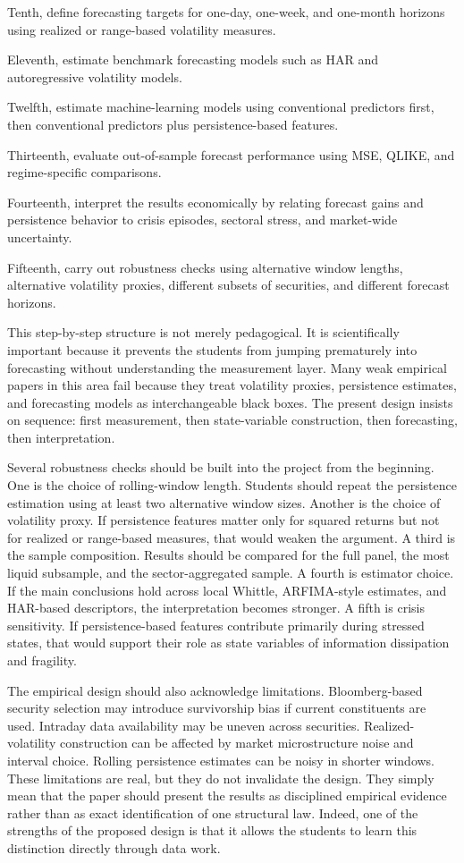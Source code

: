 \documentclass[12pt]{article}
\begin{document}
Tenth, define forecasting targets for one-day, one-week, and one-month horizons using realized or range-based volatility measures.

Eleventh, estimate benchmark forecasting models such as HAR and autoregressive volatility models.

Twelfth, estimate machine-learning models using conventional predictors first, then conventional predictors plus persistence-based features.

Thirteenth, evaluate out-of-sample forecast performance using MSE, QLIKE, and regime-specific comparisons.

Fourteenth, interpret the results economically by relating forecast gains and persistence behavior to crisis episodes, sectoral stress, and market-wide uncertainty.

Fifteenth, carry out robustness checks using alternative window lengths, alternative volatility proxies, different subsets of securities, and different forecast horizons.

This step-by-step structure is not merely pedagogical. It is scientifically important because it prevents the students from jumping prematurely into forecasting without understanding the measurement layer. Many weak empirical papers in this area fail because they treat volatility proxies, persistence estimates, and forecasting models as interchangeable black boxes. The present design insists on sequence: first measurement, then state-variable construction, then forecasting, then interpretation.

Several robustness checks should be built into the project from the beginning. One is the choice of rolling-window length. Students should repeat the persistence estimation using at least two alternative window sizes. Another is the choice of volatility proxy. If persistence features matter only for squared returns but not for realized or range-based measures, that would weaken the argument. A third is the sample composition. Results should be compared for the full panel, the most liquid subsample, and the sector-aggregated sample. A fourth is estimator choice. If the main conclusions hold across local Whittle, ARFIMA-style estimates, and HAR-based descriptors, the interpretation becomes stronger. A fifth is crisis sensitivity. If persistence-based features contribute primarily during stressed states, that would support their role as state variables of information dissipation and fragility.

The empirical design should also acknowledge limitations. Bloomberg-based security selection may introduce survivorship bias if current constituents are used. Intraday data availability may be uneven across securities. Realized-volatility construction can be affected by market microstructure noise and interval choice. Rolling persistence estimates can be noisy in shorter windows. These limitations are real, but they do not invalidate the design. They simply mean that the paper should present the results as disciplined empirical evidence rather than as exact identification of one structural law. Indeed, one of the strengths of the proposed design is that it allows the students to learn this distinction directly through data work.
\end{document}

